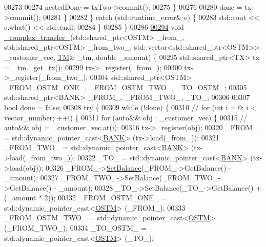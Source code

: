 \begin{DoxyCode}
00273 
00274                 nestedDone = txTwo->commit();
00275             \}
00276 
00280             done = tx->commit();
00281         \}
00282     \} \textcolor{keywordflow}{catch} (std::runtime\_error& e) \{
00283         std::cout << e.what() << std::endl;
00284     \}
00285 \}
00286 
\hypertarget{main_8cpp_source.tex_l00294}{}\hyperlink{main_8cpp_a0099d241c74532abfb1baae50a52da52_a0099d241c74532abfb1baae50a52da52}{00294} \textcolor{keywordtype}{void} \hyperlink{main_8cpp_a0099d241c74532abfb1baae50a52da52_a0099d241c74532abfb1baae50a52da52}{\_complex\_transfer\_}(std::shared\_ptr<OSTM> \_from\_, std::shared\_ptr<OSTM> \_from\_two\_, 
      std::vector<std::shared\_ptr<OSTM>> \_customer\_vec, \hyperlink{class_t_m}{TM}& \_tm, \textcolor{keywordtype}{double} \_amount) \{
00295     std::shared\_ptr<TX> tx = \_tm.\hyperlink{class_t_m_a41cb0226cc4080c931651b13f74a0075_a41cb0226cc4080c931651b13f74a0075}{\_get\_tx}();
00299     tx->\_register(\_from\_);
00300     tx->\_register(\_from\_two\_);
00304     std::shared\_ptr<OSTM> \_FROM\_OSTM\_ONE\_, \_FROM\_OSTM\_TWO\_, \_TO\_OSTM\_;
00305     std::shared\_ptr<BANK> \_FROM\_, \_FROM\_TWO\_, \_TO\_;
00306 
00307     \textcolor{keywordtype}{bool} done = \textcolor{keyword}{false};
00308     \textcolor{keywordflow}{try} \{
00309         \textcolor{keywordflow}{while} (!done) \{
00310             \textcolor{comment}{// for (int i = 0; i < vector\_number; ++i) \{}
00311             \textcolor{keywordflow}{for} (\textcolor{keyword}{auto}&& obj : \_customer\_vec) \{
00315                 \textcolor{comment}{// auto&& obj = \_customer\_vec.at(i);}
00316                 tx->\_register(obj);
00320                 \_FROM\_ = std::dynamic\_pointer\_cast<\hyperlink{class_b_a_n_k}{BANK}> (tx->load(\_from\_));
00321                 \_FROM\_TWO\_ = std::dynamic\_pointer\_cast<\hyperlink{class_b_a_n_k}{BANK}> (tx->load(\_from\_two\_));
00322                 \_TO\_ = std::dynamic\_pointer\_cast<\hyperlink{class_b_a_n_k}{BANK}> (tx->load(obj));
00326                 \_FROM\_->\hyperlink{class_b_a_n_k_ae3e45b407bf8ec7175662442ea24b7c0_ae3e45b407bf8ec7175662442ea24b7c0}{SetBalance}(\_FROM\_->GetBalance() - \_amount);
00327                 \_FROM\_TWO\_->SetBalance(\_FROM\_TWO\_->GetBalance() - \_amount);
00328                 \_TO\_->SetBalance(\_TO\_->GetBalance() + (\_amount * 2));
00332                 \_FROM\_OSTM\_ONE\_ = std::dynamic\_pointer\_cast<\hyperlink{class_o_s_t_m}{OSTM}> (\_FROM\_);
00333                 \_FROM\_OSTM\_TWO\_ = std::dynamic\_pointer\_cast<\hyperlink{class_o_s_t_m}{OSTM}> (\_FROM\_TWO\_);
00334                 \_TO\_OSTM\_ = std::dynamic\_pointer\_cast<\hyperlink{class_o_s_t_m}{OSTM}> (\_TO\_);

\end{DoxyCode}
